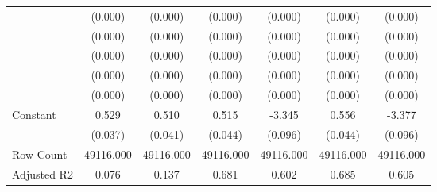 \begin{table}[htbp]
\begin{tabular}{l*{6}{c}}
                    &     (0.000)         &     (0.000)         &     (0.000)         &     (0.000)         &     (0.000)         &     (0.000)         \\
                    &     (0.000)         &     (0.000)         &     (0.000)         &     (0.000)         &     (0.000)         &     (0.000)         \\
                    &     (0.000)         &     (0.000)         &     (0.000)         &     (0.000)         &     (0.000)         &     (0.000)         \\
                    &     (0.000)         &     (0.000)         &     (0.000)         &     (0.000)         &     (0.000)         &     (0.000)         \\
                    &     (0.000)         &     (0.000)         &     (0.000)         &     (0.000)         &     (0.000)         &     (0.000)         \\
Constant            &       0.529\sym{***}&       0.510\sym{***}&       0.515\sym{***}&      -3.345\sym{***}&       0.556\sym{***}&      -3.377\sym{***}\\
                    &     (0.037)         &     (0.041)         &     (0.044)         &     (0.096)         &     (0.044)         &     (0.096)         \\
\hline
Row Count           &   49116.000         &   49116.000         &   49116.000         &   49116.000         &   49116.000         &   49116.000         \\
Adjusted R2         &       0.076         &       0.137         &       0.681         &       0.602         &       0.685         &       0.605         \\

\end{tabular}
\end{table}
